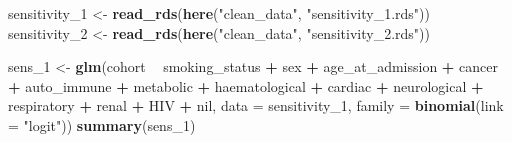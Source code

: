 \documentclass[
]{article}
\newenvironment{Shaded}{\begin{snugshade}}{\end{snugshade}}
\newcommand{\DataTypeTok}[1]{\textcolor[rgb]{0.13,0.29,0.53}{#1}}
\newcommand{\DecValTok}[1]{\textcolor[rgb]{0.00,0.00,0.81}{#1}}
\newcommand{\KeywordTok}[1]{\textcolor[rgb]{0.13,0.29,0.53}{\textbf{#1}}}
\newcommand{\NormalTok}[1]{#1}
\newcommand{\OperatorTok}[1]{\textcolor[rgb]{0.81,0.36,0.00}{\textbf{#1}}}
\newcommand{\StringTok}[1]{\textcolor[rgb]{0.31,0.60,0.02}{#1}}
\begin{document}
\begin{Shaded}
\begin{Highlighting}[]
\NormalTok{sensitivity_}\DecValTok{1}\NormalTok{ <-}\StringTok{ }\KeywordTok{read_rds}\NormalTok{(}\KeywordTok{here}\NormalTok{(}\StringTok{"clean_data"}\NormalTok{, }\StringTok{"sensitivity_1.rds"}\NormalTok{))}
\NormalTok{sensitivity_}\DecValTok{2}\NormalTok{ <-}\StringTok{ }\KeywordTok{read_rds}\NormalTok{(}\KeywordTok{here}\NormalTok{(}\StringTok{"clean_data"}\NormalTok{, }\StringTok{"sensitivity_2.rds"}\NormalTok{))}

\NormalTok{sens_}\DecValTok{1}\NormalTok{ <-}\StringTok{ }\KeywordTok{glm}\NormalTok{(cohort }\OperatorTok{~}\StringTok{ }\NormalTok{smoking_status }\OperatorTok{+}\StringTok{ }\NormalTok{sex }\OperatorTok{+}\StringTok{ }\NormalTok{age_at_admission }\OperatorTok{+}\StringTok{ }
\StringTok{                      }\NormalTok{cancer }\OperatorTok{+}\StringTok{ }\NormalTok{auto_immune }\OperatorTok{+}\StringTok{ }\NormalTok{metabolic }\OperatorTok{+}\StringTok{ }\NormalTok{haematological }\OperatorTok{+}\StringTok{ }\NormalTok{cardiac }\OperatorTok{+}\StringTok{ }\NormalTok{neurological }\OperatorTok{+}\StringTok{ }\NormalTok{respiratory }\OperatorTok{+}\StringTok{ }\NormalTok{renal }\OperatorTok{+}\StringTok{ }\NormalTok{HIV }\OperatorTok{+}\StringTok{ }\NormalTok{nil,}
                      \DataTypeTok{data =}\NormalTok{ sensitivity_}\DecValTok{1}\NormalTok{, }\DataTypeTok{family =} \KeywordTok{binomial}\NormalTok{(}\DataTypeTok{link =} \StringTok{"logit"}\NormalTok{))}
\KeywordTok{summary}\NormalTok{(sens_}\DecValTok{1}\NormalTok{)}
\end{Highlighting}
\end{Shaded}
\end{document}
